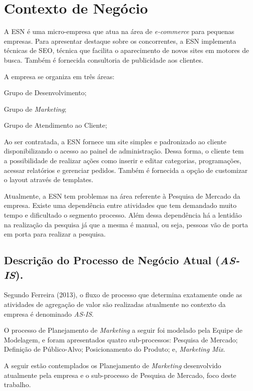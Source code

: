 \section{Contexto de Negócio}
	A ESN é uma micro-empresa que atua na área de \textit{e-commerce} para pequenas empresas. Para apresentar destaque sobre os concorrentes, a ESN implementa técnicas de SEO, técnica que facilita o aparecimento de novos sites em motores de busca. Também é fornecida consultoria de publicidade aos clientes.

	A empresa se organiza em três áreas:
	\begin{itemize}
	{
		\item Grupo de Desenvolvimento;
		\item Grupo de \textit{Marketing};
		\item Grupo de Atendimento ao Cliente;
	}
	\end{itemize}

	Ao ser contratada, a ESN fornece um site simples e padronizado ao cliente disponibilizando o acesso ao painel de administração. Dessa forma, o cliente tem a possibilidade de realizar ações como inserir e editar categorias, programações, acessar relatórios e gerenciar pedidos. Também é fornecida a opção de customizar o layout através de templates.

	Atualmente, a ESN tem problemas na área referente à Pesquisa de Mercado da empresa. Existe uma dependência entre atividades que tem demandado muito tempo e dificultado o segmento processo. Além dessa dependência há a lentidão na realização da pesquisa já que a mesma é manual, ou seja, pessoas vão de porta em porta para realizar a pesquisa.

	\subsection{Descrição do Processo de Negócio Atual (\textit{AS-IS}).}

		Segundo Ferreira (2013), o fluxo de processo que determina exatamente onde as atividades de agregação de valor são realizadas atualmente no contexto da empresa é denominado \textit{AS-IS}.

		O processo de Planejamento de \textit{Marketing} a seguir foi modelado pela Equipe de Modelagem, e foram apresentados quatro sub-processos: Pesquisa de Mercado; Definição de Público-Alvo; Posicionamento do Produto; e, \textit{Marketing Mix}.

		A seguir estão contemplados os Planejamento de \textit{Marketing} desenvolvido atualmente pela empresa e o sub-processo de Pesquisa de Mercado, foco deste trabalho.

